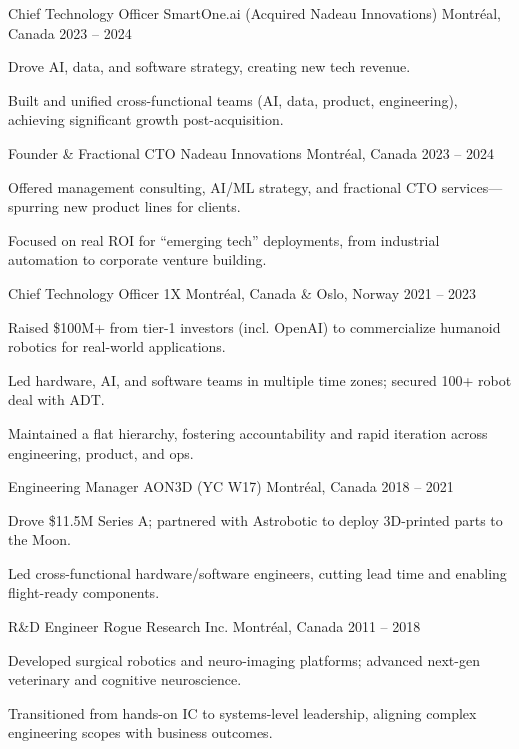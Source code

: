 \documentclass[11pt, letterpaper]{awesome-cv}
\begin{document}
\cventry
    {Chief Technology Officer}
    {SmartOne.ai (Acquired Nadeau Innovations)}
    {Montréal, Canada}
    {2023 -- 2024}
    {
      \begin{cvitems}
        \item {Drove AI, data, and software strategy, creating new tech revenue.}
        \item {Built and unified cross-functional teams (AI, data, product, engineering), achieving significant growth post-acquisition.}
      \end{cvitems}
    }

\cventry
    {Founder \& Fractional CTO}
    {Nadeau Innovations}
    {Montréal, Canada}
    {2023 -- 2024}
    {
      \begin{cvitems}
        \item {Offered management consulting, AI/ML strategy, and fractional CTO services—spurring new product lines for clients.}
        \item {Focused on real ROI for “emerging tech” deployments, from industrial automation to corporate venture building.}
      \end{cvitems}
    }

\cventry
    {Chief Technology Officer}
    {1X}
    {Montréal, Canada \& Oslo, Norway}
    {2021 -- 2023}
    {
      \begin{cvitems}
        \item {Raised \$100M+ from tier-1 investors (incl. OpenAI) to commercialize humanoid robotics for real-world applications.}
        \item {Led hardware, AI, and software teams in multiple time zones; secured 100+ robot deal with ADT.}
        \item {Maintained a flat hierarchy, fostering accountability and rapid iteration across engineering, product, and ops.}
      \end{cvitems}
    }

\cventry
    {Engineering Manager}
    {AON3D (YC W17)}
    {Montréal, Canada}
    {2018 -- 2021}
    {
      \begin{cvitems}
        \item {Drove \$11.5M Series A; partnered with Astrobotic to deploy 3D-printed parts to the Moon.}
        \item {Led cross-functional hardware/software engineers, cutting lead time and enabling flight-ready components.}
      \end{cvitems}
    }

\cventry
    {R\&D Engineer}
    {Rogue Research Inc.}
    {Montréal, Canada}
    {2011 -- 2018}
    {
      \begin{cvitems}
        \item {Developed surgical robotics and neuro-imaging platforms; advanced next-gen veterinary and cognitive neuroscience.}
        \item {Transitioned from hands-on IC to systems-level leadership, aligning complex engineering scopes with business outcomes.}
      \end{cvitems}
    }
\end{document}
